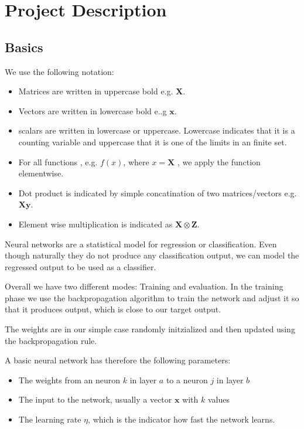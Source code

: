 \chapter{Project Description}

\section{Basics}

We use the following notation:
\begin{itemize}
\item Matrices are written in uppercase bold e.g. $\mathbf{X}$.
\item Vectors are written in lowercase bold e..g $\mathbf{x}$.
\item scalars are written in lowercase or uppercase. Lowercase indicates that it is a counting variable and uppercase that it is one of the limits in an finite set.
\item For all functions , e.g. $f(x)$, where $x = \mathbf{X}$ , we apply the function elementwise.
\item Dot product is indicated by simple concatination of two matrices/vectors e.g. $\mathbf{X} \mathbf{y}$.
\item Element wise multiplication is indicated as $\mathbf{X} \otimes \mathbf{Z}$.
\end{itemize}

Neural networks are a statistical model for regression or classification. Even though naturally they do not produce any classification output, we can model the regressed output to be used as a classifier. 

Overall we have two different modes: Training and evaluation. In the training phase we use the backpropagation algorithm to train the network and adjust it so that it produces output, which is close to our target output.

The weights are in our simple case randomly initzialized and then updated using the backpropagation rule.

A basic neural network has therefore the following parameters:
\begin{itemize}
\item The weights from an neuron $k$ in layer $a$ to a neuron $j$ in layer $b$
\item The input to the network, usually a vector $\mathbf{x}$ with $k$ values
\item The learning rate $\eta$, which is the indicator how fast the network learns.
\end{itemize}

